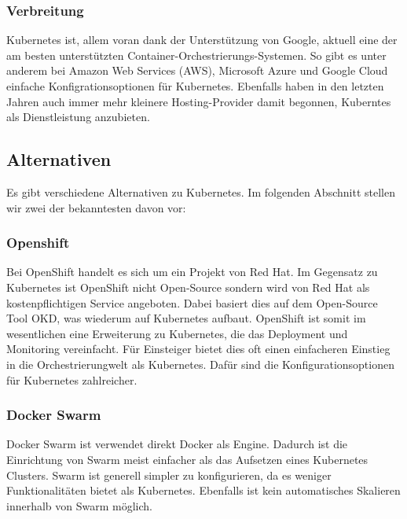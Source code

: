 \subsubsection{Verbreitung}
Kubernetes ist, allem voran dank der Unterstützung von Google, aktuell eine der am besten unterstützten Container-Orchestrierungs-Systemen. So gibt es unter anderem bei Amazon Web Services (AWS), Microsoft Azure und Google Cloud einfache Konfigrationsoptionen für Kubernetes.
Ebenfalls haben in den letzten Jahren auch immer mehr kleinere Hosting-Provider damit begonnen, Kuberntes als Dienstleistung anzubieten.

\subsection{Alternativen}
Es gibt verschiedene Alternativen zu Kubernetes. Im folgenden Abschnitt stellen wir zwei der bekanntesten davon vor:

\subsubsection{Openshift}
Bei OpenShift handelt es sich um ein Projekt von Red Hat. Im Gegensatz zu Kubernetes ist OpenShift nicht Open-Source sondern wird von Red Hat als kostenpflichtigen Service angeboten. Dabei basiert dies auf dem Open-Source Tool OKD, was wiederum auf Kubernetes aufbaut.
OpenShift ist somit im wesentlichen eine Erweiterung zu Kubernetes, die das Deployment und Monitoring vereinfacht. Für Einsteiger bietet dies oft einen einfacheren Einstieg in die Orchestrierungwelt als Kubernetes. Dafür sind die Konfigurationsoptionen für Kubernetes zahlreicher. \cite{cloudowski:openshift}

\subsubsection{Docker Swarm}
Docker Swarm ist verwendet direkt Docker als Engine. Dadurch ist die Einrichtung von Swarm meist einfacher als das Aufsetzen eines Kubernetes Clusters. Swarm ist generell simpler zu konfigurieren, da es weniger Funktionalitäten bietet als Kubernetes. Ebenfalls ist kein automatisches Skalieren innerhalb von Swarm möglich. \cite{docker:swarm}
\clearpage
